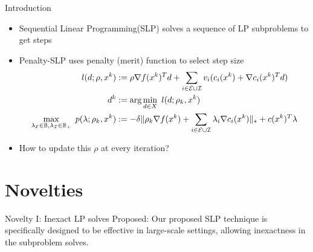 \documentclass[8pt]{beamer}
\begin{document}
	\begin{frame}[c]{Introduction}
		\begin{itemize}
			\item Sequential Linear Programming(SLP) solves a sequence of LP subproblems to get steps
			\vfill
			\item Penalty-SLP uses penalty (merit) function to select step size
			\vfill
		\begin{equation}\begin{aligned} 
			l(d; \rho, x^k) & := \rho \nabla f(x^k)^Td + \sum_{i\in{\cal E}\cup{\cal I}} v_i( c_i(x^k) + \nabla c_i(x^k)^Td)\\
			d^k & := \arg\min_{d \in X}\ l(d; \rho_k, x^k)\\
			\max_{\lambda_{{\cal E}} \in \mathbb{B}, \lambda_{{\cal I}}\in\mathbb{B}_+}\ p(\lambda; \rho_k, x^k) & :=  -\delta \|\rho_k \nabla f(x^k)+\sum_{i\in{\cal E}\cup{\cal I}}\lambda_i \nabla c_i(x^k) \|_* + c(x^k)^T\lambda
		\end{aligned}\end{equation}
		\vfill
		\item How to update this $\rho$ at every iteration? 
		\end{itemize}
	\end{frame}



\section[Novelties]{Novelties}

	\begin{frame}[c]{Novelty I: Inexact LP solves}
		\vfill
		{\red  \leftpointright Proposed: } 
		Our proposed SLP technique is specifically designed to be effective in large-scale settings, allowing {\red inexactness} in the subproblem solves. 
		\vfill
	\end{frame}
\end{document}
